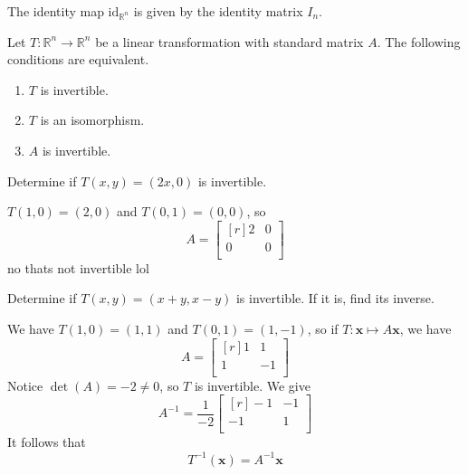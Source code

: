 \begin{remark}
    The identity map \(\text{id}_{\mathbb{R}^n} \) is given by the identity matrix \(I_n\).
\end{remark}
\begin{theorem}
    Let \(T:\mathbb{R}^{n}\to \mathbb{R}^n \) be a linear transformation with standard matrix \(A\). The following conditions are equivalent. 
    \begin{enumerate}
        \item \(T\) is invertible. 
        \item \(T\) is an isomorphism.
        \item \(A\) is invertible.
    \end{enumerate}
\end{theorem}
\begin{exercise}
    Determine if \(T(x,y)=(2x,0)\) is invertible.
\end{exercise}
\begin{solution}
    \(T(1,0)=(2,0)\) and \(T(0,1)=(0,0)\), so 
    \[
        A=\begin{bmatrix}[r]
            2 & 0  \\
             0&0   \\
        \end{bmatrix}
    \]
    no thats not invertible lol
\end{solution}
\begin{exercise}
    Determine if \(T(x,y)=(x+y,x-y)\) is invertible. If it is, find its inverse.
\end{exercise}
\begin{solution}
    We have \(T(1,0)=(1,1)\) and \(T(0,1)=(1,-1)\), so if \(T:\mathbf{x}\mapsto A \mathbf{x}\), we have
    \[
        A=\begin{bmatrix}[r]
            1 &1   \\
             1&-1   \\
        \end{bmatrix}
    \]
    Notice \(\det (A)=-2\neq 0\), so \(T\) is invertible. We give 
    \[
        A^{-1} = \frac{1}{-2} \begin{bmatrix}[r]
            -1 &-1   \\
             -1&1   \\
        \end{bmatrix}
    \]
    It follows that 
    \[
        T^{-1} (\mathbf{x})= A^{-1} \mathbf{x}
    \]
\end{solution}
